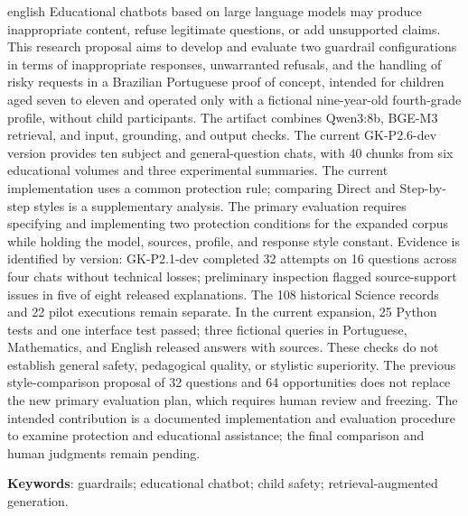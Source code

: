 \documentclass[12pt,openany,oneside,a4paper,chapter=TITLE,english,brazil]{abntex2}
\renewcommand{\listfigurename}{LISTA DE ILUSTRAÇÕES}%
\renewcommand{\listtablename}{LISTA DE TABELAS}%
\begin{document}
\begin{resumo}[ABSTRACT]
\SingleSpacing\fontsize{11}{13.2}\selectfont

\begin{otherlanguage*}{english}
Educational chatbots based on large language models may produce inappropriate content, refuse legitimate questions, or add unsupported claims. This research proposal aims to develop and evaluate two guardrail configurations in terms of inappropriate responses, unwarranted refusals, and the handling of risky requests in a Brazilian Portuguese proof of concept, intended for children aged seven to eleven and operated only with a fictional nine-year-old fourth-grade profile, without child participants. The artifact combines Qwen3:8b, BGE-M3 retrieval, and input, grounding, and output checks. The current GK-P2.6-dev version provides ten subject and general-question chats, with 40 chunks from six educational volumes and three experimental summaries. The current implementation uses a common protection rule; comparing Direct and Step-by-step styles is a supplementary analysis. The primary evaluation requires specifying and implementing two protection conditions for the expanded corpus while holding the model, sources, profile, and response style constant. Evidence is identified by version: GK-P2.1-dev completed 32 attempts on 16 questions across four chats without technical losses; preliminary inspection flagged source-support issues in five of eight released explanations. The 108 historical Science records and 22 pilot executions remain separate. In the current expansion, 25 Python tests and one interface test passed; three fictional queries in Portuguese, Mathematics, and English released answers with sources. These checks do not establish general safety, pedagogical quality, or stylistic superiority. The previous style-comparison proposal of 32 questions and 64 opportunities does not replace the new primary evaluation plan, which requires human review and freezing. The intended contribution is a documented implementation and evaluation procedure to examine protection and educational assistance; the final comparison and human judgments remain pending.

\vspace{\onelineskip}\noindent\textbf{Keywords}: guardrails; educational chatbot; child safety; retrieval-augmented generation.
\end{otherlanguage*}
\end{resumo}
\pdfbookmark[0]{\listfigurename}{lof}
\listoffigures*
\cleardoublepage
\pdfbookmark[0]{\listtablename}{lot}
\end{document}

